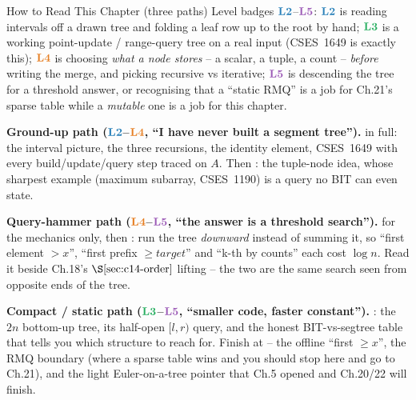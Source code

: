 \begin{chaptertheorybox}{How to Read This Chapter (three paths)}
Level badges \(\lv2\)--\(\lv5\): \(\lv2\) is reading intervals off a drawn
tree and folding a leaf row up to the root by hand; \(\lv3\) is a working
point-update / range-query tree on a real input (CSES~1649 is exactly this);
\(\lv4\) is choosing \emph{what a node stores} -- a scalar, a tuple, a count --
\emph{before} writing the merge, and picking recursive vs iterative; \(\lv5\)
is descending the tree for a threshold answer, or recognising that a
``static RMQ'' is a job for Ch.21's sparse table while a
\emph{mutable} one is a job for this chapter.

\textbf{Ground-up path (\(\lv2\)--\(\lv4\), ``I have never built a segment
tree'').}  in full: the interval picture, the three
recursions, the identity element, CSES~1649 with every build/update/query
step traced on \(A\).  Then : the tuple-node idea, whose
sharpest example (maximum subarray, CSES~1190) is a query no BIT can even
state.

\textbf{Query-hammer path (\(\lv4\)--\(\lv5\), ``the answer is a threshold
search'').}  for the mechanics only, then
: run the tree \emph{downward} instead of summing it, so
``first element \(>x\)'', ``first prefix \(\ge\mathit{target}\)'' and ``k-th
by counts'' each cost \(\log n\).  Read it beside Ch.18's \(\secref{c14-order}\)
lifting -- the two are the same search seen from opposite ends of the tree.

\textbf{Compact / static path (\(\lv3\)--\(\lv5\), ``smaller code, faster
constant'').} : the \(2n\) bottom-up tree, its half-open
\([l,r)\) query, and the honest BIT-vs-segtree table that tells you which
structure to reach for.  Finish at  -- the offline
``first \(\ge x\)'', the RMQ boundary (where a sparse table wins and you
should stop here and go to Ch.21), and the light Euler-on-a-tree pointer that
Ch.5 opened and Ch.20/22 will finish.
\end{chaptertheorybox}

